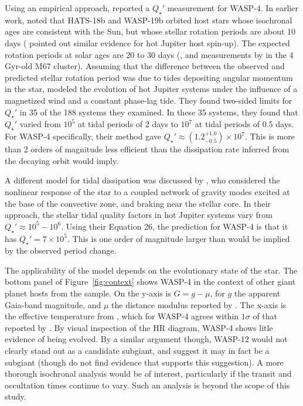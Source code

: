 \documentclass[12pt,twocolumn,tighten]{aastex62}
\begin{document}
Using an empirical approach, \citet{penev_empirical_2018} reported a
$Q_\star'$ measurement for WASP-4.
In earlier work,
\citet{penev_hats-18b_2016} noted that HATS-18b and WASP-19b orbited
host stars whose isochronal ages are consistent with the Sun, but
whose stellar rotation periods are about 10 days
(\citealt{pont_empirical_2009} pointed out similar evidence for hot Jupiter 
host 
spin-up).  The expected rotation periods at solar ages
are 20 to 30 days
(\citealt{schatzman_theory_1962,skumanich_time_1972}, and measurements
by \citealt{barnes_rotation_2016} in the 4\,Gyr-old M67 cluster).
Assuming that the difference between the observed and predicted
stellar rotation period was due to tides depositing angular momentum
in the star,
\citet{penev_empirical_2018} 
modeled the evolution of hot Jupiter systems under
the influence of a magnetized wind and a constant phase-lag tide.
They found two-sided limits for $Q_\star'$ in 35 of
the 188 systems they examined.  In these 35 systems, they found that
$Q_\star'$ varied from $10^5$ at tidal periods of 2 days to $10^7$ at
tidal periods of 0.5 days.  For WASP-4 specifically, their method gave
$Q_\star' \approx (1.2^{+1.0}_{-0.5})\times10^7$. This is more than 2 orders
of magnitude less efficient than the dissipation rate inferred from
the decaying orbit would imply.

A different model for tidal dissipation was discussed by
\citet{essick_orbital_2016}, who considered the nonlinear response of
the star to a coupled network of gravity modes excited at the base of
the convective zone, and braking near the stellar core.  In their
approach, the stellar tidal quality factors in hot Jupiter systems
vary from $Q_\star' \approx 10^5 - 10^6$.  Using their Equation 26,
the prediction for WASP-4 is that it has $Q_\star' = 7\times10^5$.
This is one order of magnitude larger than would be implied by the
observed period change.

The applicability of the \citet{essick_orbital_2016} model depends on
the evolutionary state of the star.  The bottom panel of
Figure~\ref{fig:context} shows WASP-4 in the context of other giant
planet hosts from the \citet{bonomo_gaps_2017} sample.  On the y-axis
is $G=g-\mu$, for $g$ the apparent Gaia-band magnitude, and $\mu$ the
distance modulus reported by \citet{gaia_collaboration_gaia_2018}.
The x-axis is the effective temperature from \citet{bonomo_gaps_2017},
which for WASP-4 agrees within $1\sigma$ of that reported by
\citet{petrucci_no_2013}.  By visual inspection of the HR diagram,
WASP-4 shows litle evidence of being evolved.  By a similar argument
though, WASP-12 would not clearly stand out as a candidate subgiant,
and \citet{weinberg_tidal_2017} suggest it may in fact be a subgiant
(though \citealt{bailey_understanding_2019} do not find evidence that
supports this suggestion).  A more thorough isochronal analysis would
be of interest, particularly if the transit and occultation times
continue to vary.  Such an analysis is beyond the scope of this study.
\end{document}

